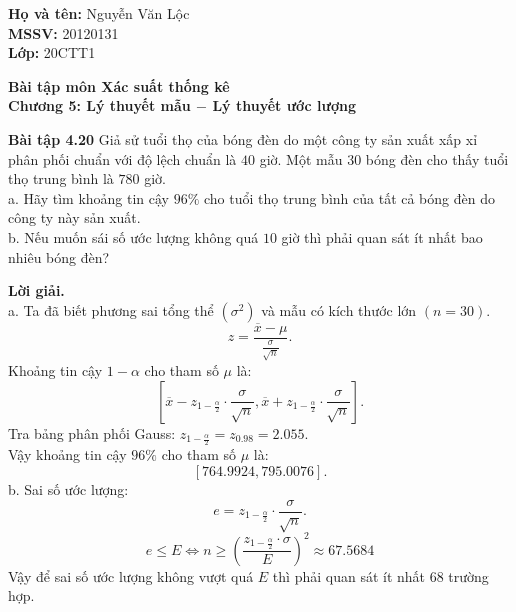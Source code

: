 \documentclass[12pt,a4paper]{article}
\author{Nguyễn Văn Lộc}
\begin{document}
    \fancyhf{}
    \lhead{}
    \chead{}
    \rhead{}
    \cfoot{}
    \rfoot{\thepage}
    \lfoot{}
    \pagestyle{fancy}
    \renewcommand{\headrulewidth}{0pt}
    \renewcommand{\footrulewidth}{0pt}
    \begin{mybox}
    \textbf{Họ và tên:} Nguyễn Văn Lộc\\
    \textbf{MSSV:} 20120131\\
    \textbf{Lớp:} 20CTT1
    \end{mybox}
    \begin{center}
    \fontsize{16}{14}\selectfont
    \textbf{Bài tập môn Xác suất thống kê}\\
    \textbf{Chương 5: Lý thuyết mẫu $-$ Lý thuyết ước lượng}
    \end{center}
    
\begin{mybox}
\textbf{Bài tập 4.20} Giả sử tuổi thọ của bóng đèn do một công ty sản xuất xấp xỉ phân phối chuẩn với độ lệch chuẩn là $40$ giờ. Một mẫu $30$ bóng đèn cho thấy tuổi thọ trung bình là $780$ giờ.\\
a. Hãy tìm khoảng tin cậy $96\%$ cho tuổi thọ trung bình của tất cả bóng đèn do công ty này sản xuất.\\
b. Nếu muốn sái số ước lượng không quá $10$ giờ thì phải quan sát ít nhất bao nhiêu bóng đèn?
\end{mybox}
\textbf{Lời giải.}\\
a. Ta đã biết phương sai tổng thể $\left( {\sigma^2} \right)$ và mẫu có kích thước lớn $\left( {n = 30} \right).$
$$z = \frac{\overline{x} - \mu}{\frac{\sigma}{\sqrt{n}}}.$$
Khoảng tin cậy $1 - \alpha$ cho tham số $\mu$ là:
$$\left[ {\overline{x} - z_{1 - \frac{\alpha}{2}} \cdot \frac{\sigma}{\sqrt{n}}, {\overline{x} + z_{1 - \frac{\alpha}{2}} \cdot \frac{\sigma}{\sqrt{n}}}} \right].$$
Tra bảng phân phối Gauss: $z_{1 - \frac{\alpha}{2}} = z_{0.98} = 2.055.$\\
Vậy khoảng tin cậy $96\%$ cho tham số $\mu$ là:
$$\left[ {764.9924, 795.0076} \right].$$
b. Sai số ước lượng:
$$e = z_{1 - \frac{\alpha}{2}} \cdot \frac{\sigma}{\sqrt{n}}.$$
$$e \leqslant E \Leftrightarrow n \geqslant {\left( {\frac{{{z_{1 - \frac{\alpha }{2}}} \cdot \sigma}}{E}} \right)^2} \approx 67.5684$$
Vậy để sai số ước lượng không vượt quá $E$ thì phải quan sát ít nhất $68$ trường hợp.
\end{document}
